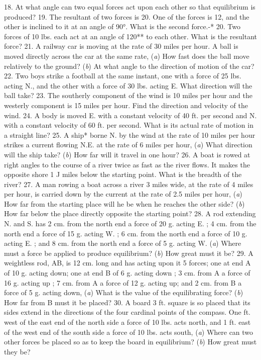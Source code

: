 18. At what angle can two equal forces act upon each other so that equilibrium is produced?
19. The resultant of two forces is 20. One of the forces is 12, and the other is inclined to it at an angle of 90°. What is the second force.-*
20. Two forces of 10 lbs. each act at an angle of 120** to each other. What is the resultant force?
21. A railway car is moving at the rate of 30 miles per hour. A ball is moved directly across the car at the same rate, (\emph{a}) How fast does the ball move relatively to the ground? (\emph{b}) At what angle to the direction of motion of the car?
22. Two boys strike a football at the same instant, one with a force of 25 lbs. acting N., and the other with a force of 30 lbs. acting E. What direction will the ball take?
23. The southerly component of the wind is 10 miles per hour and the westerly component is 15 miles per hour. Find the direction and velocity of the wind.
24. A body is moved E. with a constant velocity of 40 ft. per second and N. with a constant velocity of 60 ft. per second. What is its actual rate of motion in a straight line?
25. A ship* borne N. by the wind at the rate of 10 miles per hour strikes a current flowing N.E. at the rate of 6 miles per hour, (\emph{a}) What direction will the ship take? (\emph{b}) How far will it travel in one hour?
26. A boat is rowed at right angles to the course of a river twice as fast as the river flows. It makes the opposite shore 1 J miles below the starting point. What is the breadth of the river?
27. A man rowing a boat across a river 3 miles wide, at the rate of 4 miles per hour, is carried down by the current at the rate of 2.5 miles per hour, (\emph{a}) How far from the starting place will he be when he reaches the other side? (\emph{b}) How far below the place directly opposite the starting point?
28. A rod extending N. and S. has 2 cm. from the north end a force of 20 g. acting E. ; 4 cm. from the north end a force of 15 g. acting W. ; 6 cm. from the north end a force of 10 g. acting E. ; and 8 cm. from the north end a force of 5 g. acting W. (\emph{a}) Where must a force be applied to produce equilibrium? (\emph{b}) How great must it be?
29. A weightless rod, AB, is 12 cm. long and has acting upon it 5 forces; one at end A of 10 g. acting down; one at end B of 6 g. acting down ; 3 cm. from A a force of 16 g. acting up ; 7 cm. from A a force of 12 g. acting up; and 2 cm. from B a force of 5 g. acting down, (\emph{a}) What is the value of the equilibrating force? (\emph{b}) How far from B must it be placed?
30. A board 3 ft. square is so placed that its sides extend in the directions of the four cardinal points of the compass. One ft. west of the east end of the north side a force of 10 lbs. acts north, and 1 ft. east of the west end of the south side a force of 10 lbs. acts south, (\emph{a}) Where can two other forces be placed so as to keep the board in equilibrium? (\emph{b}) How great must they be?
